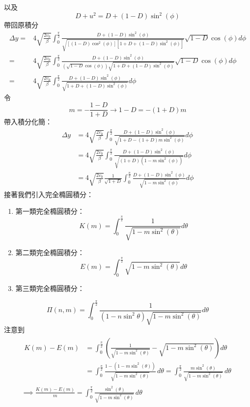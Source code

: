 \documentclass[12pt]{article}
\begin{document}
以及
\begin{equation*}
    D+u^2=D+(1-D)\sin^2{(\phi)}
\end{equation*}
帶回原積分
\begin{align*}
    \Delta y=&4\sqrt{\frac{2v_0}{\beta}}\int_{0}^{\frac{\pi}{2}}{\frac{D+(1-D)\sin^2{(\phi)}}{\sqrt{[(1-D)\cos^2{(\phi)}][1+D+(1-D)\sin^2{(\phi)}]}}}\sqrt{1-D}\cos{(\phi)}d\phi\\
    =&4\sqrt{\frac{2v_0}{\beta}}\int_{0}^{\frac{\pi}{2}}{\frac{D+(1-D)\sin^2{(\phi)}}{\left(\sqrt{1-D}\cos{(\phi)}\right)\sqrt{1+D+(1-D)\sin^2{(\phi)}}}}\sqrt{1-D}\cos{(\phi)}d\phi\\
    =&4\sqrt{\frac{2v_0}{\beta}}\int_{0}^{\frac{\pi}{2}}{\frac{D+(1-D)\sin^2{(\phi)}}{\sqrt{1+D+(1-D)\sin^2{(\phi)}}}}d\phi
\end{align*}
令\[m=-\frac{1-D}{1+D}\to 1-D=-(1+D)m\]帶入積分化簡：
\begin{align*}
    \Delta y&=4\sqrt{\frac{2v_0}{\beta}}\int_{0}^{\frac{\pi}{2}}{\frac{D+(1-D)\sin^2{(\phi)}}{\sqrt{1+D-(1+D)m\sin^2{(\phi)}}}}d\phi\\
    &=4\sqrt{\frac{2v_0}{\beta}}\int_{0}^{\frac{\pi}{2}}{\frac{D+(1-D)\sin^2{(\phi)}}{\sqrt{(1+D)(1-m\sin^2{(\phi)})}}}d\phi\\
    &=4\sqrt{\frac{2v_0}{\beta}}\frac{1}{\sqrt{1+D}}\int_{0}^{\frac{\pi}{2}}{\frac{D+(1-D)\sin^2{(\phi)}}{\sqrt{1-m\sin^2{(\phi)}}}}d\phi
\end{align*}
接著我們引入完全橢圓積分：
\begin{enumerate}
    \item 第一類完全橢圓積分：
\begin{equation}
    K(m)=\int_{0}^{\frac{\pi}{2}}{\frac{1}{\sqrt{1-m\sin^2{(\theta)}}}}d\theta
\end{equation}
    \item 第二類完全橢圓積分：
\begin{equation}
    E(m)=\int_{0}^{\frac{\pi}{2}}{\sqrt{1-m\sin^2{(\theta)}}}d\theta
\end{equation}
    \item 第三類完全橢圓積分：
\end{enumerate}
\begin{equation}
    \Pi(n,m)=\int_{0}^{\frac{\pi}{2}}{\frac{1}{(1-n\sin^2{\theta})\sqrt{1-m\sin^2(\theta)}}}d\theta
\end{equation}
注意到
\begin{gather*}
    \begin{aligned}
        K(m)-E(m) &= \int_{0}^{\frac{\pi}{2}} \left( \frac{1}{\sqrt{1-m\sin^2{(\theta)}}} - \sqrt{1-m\sin^2{(\theta)}} \right) d\theta \\
                  &= \int_{0}^{\frac{\pi}{2}} \frac{1-(1-m\sin^2{(\theta)})}{\sqrt{1-m\sin^2{(\theta)}}} \, d\theta = \int_{0}^{\frac{\pi}{2}} \frac{m\sin^2{(\theta)}}{\sqrt{1-m\sin^2{(\theta)}}} \, d\theta
    \end{aligned} \\
    \implies \frac{K(m)-E(m)}{m} = \int_{0}^{\frac{\pi}{2}} \frac{\sin^2{(\theta)}}{\sqrt{1-m\sin^2{(\theta)}}} \, d\theta
\end{gather*}
\end{document}

